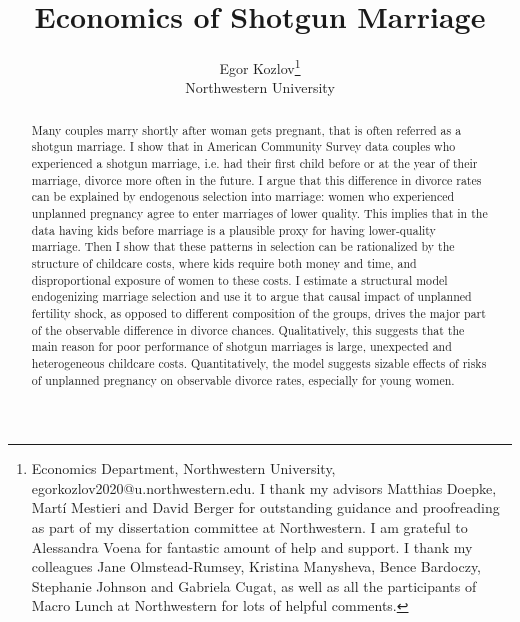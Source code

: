 \documentclass[12pt,letter]{article}
\title{Economics of Shotgun Marriage}
\author{Egor Kozlov\thanks{Economics Department, Northwestern University, egorkozlov2020@u.northwestern.edu. I thank my advisors Matthias Doepke, Martí Mestieri and David Berger for outstanding guidance and proofreading as part of my dissertation committee at Northwestern. I am grateful to Alessandra Voena for fantastic amount of help and support. I thank my colleagues Jane Olmstead-Rumsey, Kristina Manysheva, Bence Bardoczy, Stephanie Johnson and Gabriela Cugat, as well as all the participants of Macro Lunch at Northwestern for lots of helpful comments.}\\
{\small Northwestern University}}
\begin{document}
\maketitle

\begin{abstract}
Many couples marry shortly after woman gets pregnant, that is often referred as a shotgun marriage. I show that in American Community Survey data couples who experienced a shotgun marriage, i.e. had their first child before or at the year of their marriage, divorce more often in the future.
I argue that this difference in divorce rates can be explained by endogenous selection into marriage: women who experienced unplanned pregnancy agree to enter marriages of lower quality. 
This implies that in the data having kids before marriage is a plausible proxy for having lower-quality marriage.
Then I show that these patterns in selection can be rationalized by the structure of childcare costs, where kids require both money and time, and disproportional exposure of women to these costs.
I estimate a structural model endogenizing marriage selection and use it to argue that causal impact of unplanned fertility shock,
as opposed to different composition of the groups, drives the major part of the observable difference in divorce chances.
Qualitatively, this suggests that the main reason for poor performance of shotgun marriages is large, unexpected and heterogeneous childcare costs. Quantitatively, the model suggests sizable effects of risks of unplanned pregnancy on observable divorce rates, especially for young women.
\end{abstract}

\newpage
\end{document}

